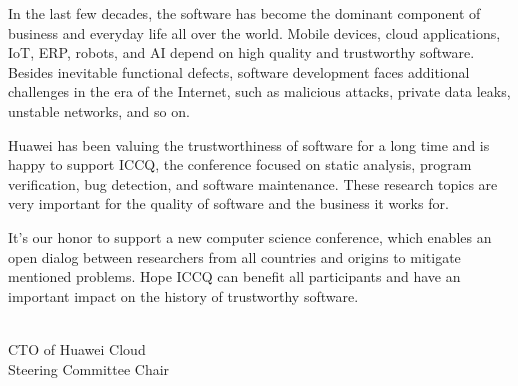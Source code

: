 \clearpage
{}

In the last few decades, the software has become the dominant component of business and everyday life all over the world. Mobile devices, cloud applications, IoT, ERP, robots, and AI depend on high quality and trustworthy software. Besides inevitable functional defects, software development faces additional challenges in the era of the Internet, such as malicious attacks, private data leaks, unstable networks, and so on.

Huawei has been valuing the trustworthiness of software for a long time and is happy to support ICCQ, the conference focused on static analysis, program verification, bug detection, and software maintenance. These research topics are very important for the quality of software and the business it works for.

It's our honor to support a new computer science conference, which enables an open dialog between researchers from all countries and origins to mitigate mentioned problems. Hope ICCQ can benefit all participants and have an important impact on the history of trustworthy software.

 \\
CTO of Huawei Cloud \\
Steering Committee Chair